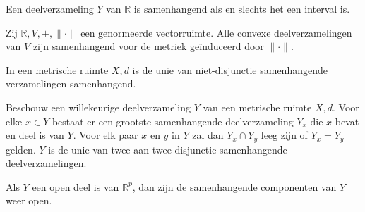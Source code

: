 \documentclass[main.tex]{subfiles}
\begin{document}
\begin{bpr}
  Een deelverzameling $Y$ van $\mathbb{R}$ is samenhangend als en slechts het een interval is.
\end{bpr}

\begin{bpr}
  Zij $\mathbb{R},V,+, \|\cdot\|$ een genormeerde vectorruimte.
  Alle convexe deelverzamelingen van $V$ zijn samenhangend voor de metriek ge\"induceerd door $\|\cdot\|$.
\end{bpr}

\begin{bpr}
  In een metrische ruimte $X,d$ is de unie van niet-disjunctie samenhangende verzamelingen samenhangend.
\end{bpr}

\begin{bpr}
  Beschouw een willekeurige deelverzameling $Y$ van een metrische ruimte $X,d$.
  Voor elke $x\in Y$ bestaat er een grootste samenhangende deelverzameling $Y_{x}$ die $x$ bevat en deel is van $Y$.
  Voor elk paar $x$ en $y$ in $Y$ zal dan $Y_{x} \cap Y_{y}$ leeg zijn of $Y_{x} = Y_{y}$ gelden.
  $Y$ is de unie van twee aan twee disjunctie samenhangende deelverzamelingen.
\end{bpr}

\begin{bpr}
 Als $Y$ een open deel is van $\mathbb{R}^{p}$, dan zijn de samenhangende componenten van $Y$ weer open.
\end{bpr}
\end{document}
